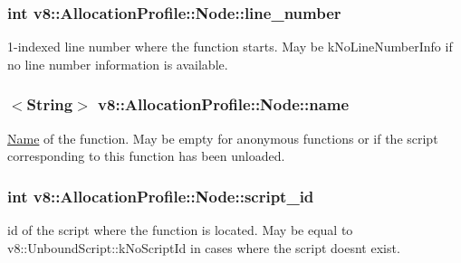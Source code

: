 \subsubsection[{\texorpdfstring{line\+\_\+number}{line_number}}]{\setlength{\rightskip}{0pt plus 5cm}int v8\+::\+Allocation\+Profile\+::\+Node\+::line\+\_\+number}\hypertarget{structv8_1_1_allocation_profile_1_1_node_ac9773c92a3af3a9a9420337599e68bd9}{}\label{structv8_1_1_allocation_profile_1_1_node_ac9773c92a3af3a9a9420337599e68bd9}
1-\/indexed line number where the function starts. May be k\+No\+Line\+Number\+Info if no line number information is available. 
\subsubsection[{\texorpdfstring{name}{name}}]{$<${\bf String}$>$ v8\+::\+Allocation\+Profile\+::\+Node\+::name}\hypertarget{structv8_1_1_allocation_profile_1_1_node_af9f2c323d6a11e836c02e8ac88adc5a8}{}\label{structv8_1_1_allocation_profile_1_1_node_af9f2c323d6a11e836c02e8ac88adc5a8}
\hyperlink{classv8_1_1_name}{Name} of the function. May be empty for anonymous functions or if the script corresponding to this function has been unloaded. 
\subsubsection[{\texorpdfstring{script\+\_\+id}{script_id}}]{\setlength{\rightskip}{0pt plus 5cm}int v8\+::\+Allocation\+Profile\+::\+Node\+::script\+\_\+id}\hypertarget{structv8_1_1_allocation_profile_1_1_node_a4a746de878d9ad42b32fda4c365b98fb}{}\label{structv8_1_1_allocation_profile_1_1_node_a4a746de878d9ad42b32fda4c365b98fb}
id of the script where the function is located. May be equal to v8\+::\+Unbound\+Script\+::k\+No\+Script\+Id in cases where the script doesn\textquotesingle{}t exist. 
